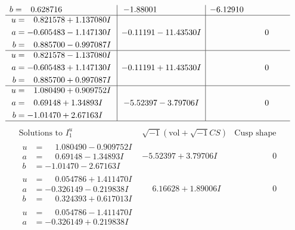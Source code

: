 \documentclass[1p]{elsarticle_modified}
\theoremstyle{definition}
\newcommand{\I}{\sqrt{-1}}
\begin{document}
$$\begin{array}{c|c|c}
\begin{aligned}
b &= \phantom{-}0.628716\phantom{ +0.000000I}\end{aligned}
 & -1.88001\phantom{ +0.000000I} & -6.12910\phantom{ +0.000000I} \\ \hline\begin{aligned}
u &= \phantom{-}0.821578 + 1.137080 I \\
a &= -0.605483 - 1.147130 I \\
b &= \phantom{-}0.885700 - 0.997087 I\end{aligned}
 & -0.11191 - 11.43530 I & \phantom{-0.000000 } 0 \\ \hline\begin{aligned}
u &= \phantom{-}0.821578 - 1.137080 I \\
a &= -0.605483 + 1.147130 I \\
b &= \phantom{-}0.885700 + 0.997087 I\end{aligned}
 & -0.11191 + 11.43530 I & \phantom{-0.000000 } 0 \\ \hline\begin{aligned}
u &= \phantom{-}1.080490 + 0.909752 I \\
a &= \phantom{-}0.69148 + 1.34893 I \\
b &= -1.01470 + 2.67163 I\end{aligned}
 & -5.52397 - 3.79706 I & \phantom{-0.000000 } 0\\
 \hline 
 \end{array}$$\newpage$$\begin{array}{c|c|c}  
\text{Solutions to }I^u_{1}& \I (\text{vol} + \sqrt{-1}CS) & \text{Cusp shape}\\
 \hline 
\begin{aligned}
u &= \phantom{-}1.080490 - 0.909752 I \\
a &= \phantom{-}0.69148 - 1.34893 I \\
b &= -1.01470 - 2.67163 I\end{aligned}
 & -5.52397 + 3.79706 I & \phantom{-0.000000 } 0 \\ \hline\begin{aligned}
u &= \phantom{-}0.054786 + 1.411470 I \\
a &= -0.326149 - 0.219838 I \\
b &= \phantom{-}0.324393 + 0.617013 I\end{aligned}
 & \phantom{-}6.16628 + 1.89006 I & \phantom{-0.000000 } 0 \\ \hline\begin{aligned}
u &= \phantom{-}0.054786 - 1.411470 I \\
a &= -0.326149 + 0.219838 I \\

\end{aligned}
\end{array}$$
\end{document}
